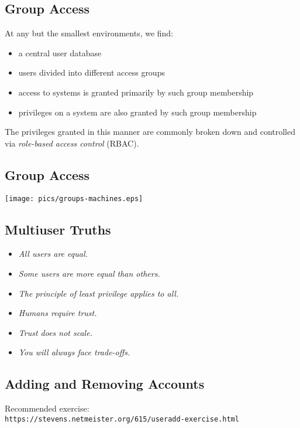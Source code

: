 \documentclass[xga]{xdvislides}
\begin{document}
\subsection{Group Access}
At any but the smallest environments, we find:
\begin{itemize}
	\item a central user database
	\item users divided into different access groups
	\item access to systems is granted primarily by such group membership
	\item privileges on a system are also granted by such group membership
\end{itemize}
\vspace{.5in}
The privileges granted in this manner are commonly
broken down and controlled via {\em role-based access
control} (RBAC).

\subsection{Group Access}
\begin{center}
	\texttt{[image: pics/groups-machines.eps]}
\end{center}

\subsection{Multiuser Truths}
\begin{itemize}
	\item {\em All users are equal.}
	\item {\em Some users are more equal than others.}
	\item {\em The principle of least privilege applies to all.}
	\item {\em Humans require trust.}
	\item {\em Trust does not scale.}
	\item {\em You will always face trade-offs.}
\end{itemize}


\subsection{Adding and Removing Accounts}

\vfill
Recommended exercise: \\
\verb+https://stevens.netmeister.org/615/useradd-exercise.html+
\vfill
\end{document}
